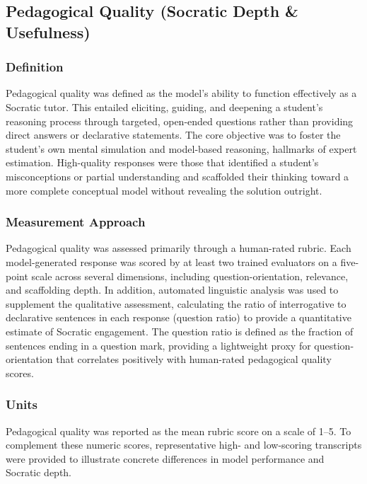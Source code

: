 \FloatBarrier

\subsection{Pedagogical Quality (Socratic Depth \& Usefulness)}
\label{subsec:pedagogical_quality}

\subsubsection{Definition}
\label{subsubsec:pedagogical_definition}
Pedagogical quality was defined as the model's ability to function effectively as a Socratic tutor. This entailed eliciting, guiding, and deepening a student's reasoning process through targeted, open-ended questions rather than providing direct answers or declarative statements. The core objective was to foster the student's own mental simulation and model-based reasoning, hallmarks of expert estimation. High-quality responses were those that identified a student's misconceptions or partial understanding and scaffolded their thinking toward a more complete conceptual model without revealing the solution outright.

\subsubsection{Measurement Approach}
\label{subsubsec:pedagogical_measurement}
Pedagogical quality was assessed primarily through a human-rated rubric. Each model-generated response was scored by at least two trained evaluators on a five-point scale across several dimensions, including question-orientation, relevance, and scaffolding depth. In addition, automated linguistic analysis was used to supplement the qualitative assessment, calculating the ratio of interrogative to declarative sentences in each response (question ratio) to provide a quantitative estimate of Socratic engagement. The question ratio is defined as the fraction of sentences ending in a question mark, providing a lightweight proxy for question-orientation that correlates positively with human-rated pedagogical quality scores.

\subsubsection{Units}
\label{subsubsec:pedagogical_units}
Pedagogical quality was reported as the mean rubric score on a scale of 1–5. To complement these numeric scores, representative high- and low-scoring transcripts were provided to illustrate concrete differences in model performance and Socratic depth.

